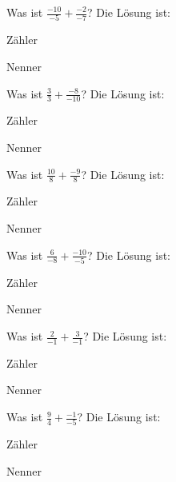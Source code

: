 \documentclass{ximera}
\begin{document}
\begin{shuffle}
\begin{question}
Was ist $\frac{-10}{-5} + \frac{-2}{-7}$?
Die Lösung ist:
\begin{solution}
Zähler 
\end{solution}
\begin{solution}
Nenner 
\end{solution}
\end{question}


\begin{question}
Was ist $\frac{3}{3} + \frac{-8}{-10}$?
Die Lösung ist:
\begin{solution}
Zähler 
\end{solution}
\begin{solution}
Nenner 
\end{solution}
\end{question}


\begin{question}
Was ist $\frac{10}{8} + \frac{-9}{8}$?
Die Lösung ist:
\begin{solution}
Zähler 
\end{solution}
\begin{solution}
Nenner 
\end{solution}
\end{question}


\begin{question}
Was ist $\frac{6}{-8} + \frac{-10}{-5}$?
Die Lösung ist:
\begin{solution}
Zähler 
\end{solution}
\begin{solution}
Nenner 
\end{solution}
\end{question}


\begin{question}
Was ist $\frac{2}{-1} + \frac{3}{-1}$?
Die Lösung ist:
\begin{solution}
Zähler 
\end{solution}
\begin{solution}
Nenner 
\end{solution}
\end{question}


\begin{question}
Was ist $\frac{9}{4} + \frac{-1}{-5}$?
Die Lösung ist:
\begin{solution}
Zähler 
\end{solution}
\begin{solution}
Nenner 
\end{solution}
\end{question}



\end{shuffle}
\end{document}
